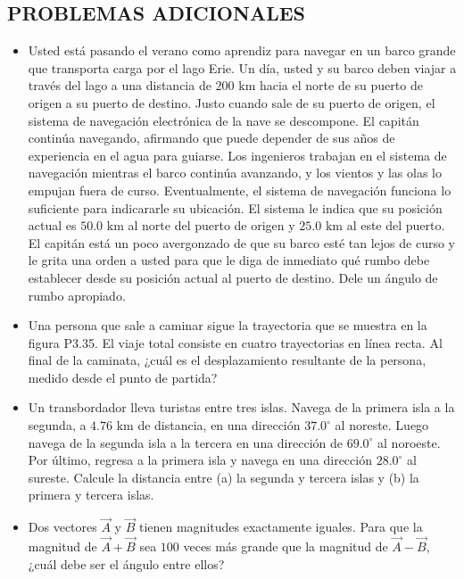 \documentclass[11pt,a4paper]{article}
\begin{document}
\newpage

\subsection*{PROBLEMAS ADICIONALES}

\begin{itemize}
    \item[\textbf{34.}] Usted está pasando el verano como aprendiz para navegar en un barco grande que transporta carga por el lago Erie. Un día, usted y su barco deben viajar a través del lago a una distancia de $200 \text{ km}$ hacia el norte de su puerto de origen a su puerto de destino. Justo cuando sale de su puerto de origen, el sistema de navegación electrónica de la nave se descompone. El capitán continúa navegando, afirmando que puede depender de sus años de experiencia en el agua para guiarse. Los ingenieros trabajan en el sistema de navegación mientras el barco continúa avanzando, y los vientos y las olas lo empujan fuera de curso. Eventualmente, el sistema de navegación funciona lo suficiente para indicararle su ubicación. El sistema le indica que su posición actual es $50.0 \text{ km}$ al norte del puerto de origen y $25.0 \text{ km}$ al este del puerto. El capitán está un poco avergonzado de que su barco esté tan lejos de curso y le grita una orden a usted para que le diga de inmediato qué rumbo debe establecer desde su posición actual al puerto de destino. Dele un ángulo de rumbo apropiado.
    \vspace*{6cm}

    \item[\textbf{35.}] Una persona que sale a caminar sigue la trayectoria que se muestra en la figura P3.35. El viaje total consiste en cuatro trayectorias en línea recta. Al final de la caminata, ¿cuál es el desplazamiento resultante de la persona, medido desde el punto de partida?
    \vspace*{6cm}

    \item[\textbf{36.}] Un transbordador lleva turistas entre tres islas. Navega de la primera isla a la segunda, a $4.76 \text{ km}$ de distancia, en una dirección $37.0^\circ$ al noreste. Luego navega de la segunda isla a la tercera en una dirección de $69.0^\circ$ al noroeste. Por último, regresa a la primera isla y navega en una dirección $28.0^\circ$ al sureste. Calcule la distancia entre (a) la segunda y tercera islas y (b) la primera y tercera islas.
    \vspace*{6cm}

    \item[\textbf{37.}] Dos vectores $\vec{A}$ y $\vec{B}$ tienen magnitudes exactamente iguales. Para que la magnitud de $\vec{A} + \vec{B}$ sea $100$ veces más grande que la magnitud de $\vec{A} - \vec{B}$, ¿cuál debe ser el ángulo entre ellos?
    \vspace*{6cm}
\end{itemize}
\end{document}
